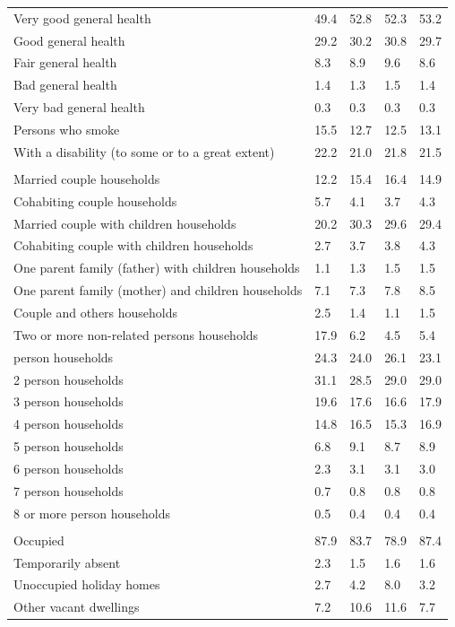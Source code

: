 \documentclass{article}
\begin{document}
\begin{table}[h]
\begin{tabular}{KTTTT}
    \hline
Very good general health & 49.4& 52.8&52.3& 53.2\\
Good general health & 29.2& 30.2& 30.8& 29.7\\
Fair general health & 8.3& 8.9&9.6& 8.6\\
Bad general health & 1.4& 1.3&1.5& 1.4\\
Very bad general health & 0.3& 0.3&0.3& 0.3\\
    \hline
Persons who smoke & 15.5& 12.7&12.5& 13.1\\
    \hline
With a disability (to some or to a great extent) & 22.2& 21.0&21.8& 21.5\\
\hline
    \\ 
    \hline
Married couple households & 12.2& 15.4& 16.4& 14.9\\
Cohabiting couple households & 5.7& 4.1& 3.7& 4.3\\
Married couple with children households & 20.2& 30.3& 29.6& 29.4\\
Cohabiting couple with children households & 2.7& 3.7& 3.8& 4.3\\
One parent family (father) with  children households & 1.1& 1.3& 1.5& 1.5\\
One parent family (mother) and children households & 7.1& 7.3& 7.8& 8.5\\
Couple and others households  & 2.5& 1.4& 1.1& 1.5\\
Two or more non-related persons households & 17.9&  6.2&  4.5&  5.4\\
     person households & 24.3& 24.0& 26.1& 23.1\\
2 person households & 31.1& 28.5& 29.0& 29.0\\
3 person households & 19.6& 17.6& 16.6& 17.9\\
4 person households & 14.8& 16.5& 15.3& 16.9\\
5 person households & 6.8& 9.1& 8.7& 8.9\\
6 person households & 2.3& 3.1& 3.1& 3.0\\
7 person households & 0.7& 0.8& 0.8& 0.8\\
8 or more person households & 0.5& 0.4& 0.4& 0.4\\
\hline
    \\ 
    \hline
Occupied & 87.9& 83.7& 78.9& 87.4\\
Temporarily absent & 2.3& 1.5& 1.6& 1.6\\
Unoccupied holiday homes & 2.7& 4.2& 8.0& 3.2\\
Other vacant dwellings &  7.2& 10.6& 11.6&  7.7\\
\hline
\end{tabular}
\end{table}
\end{document}
